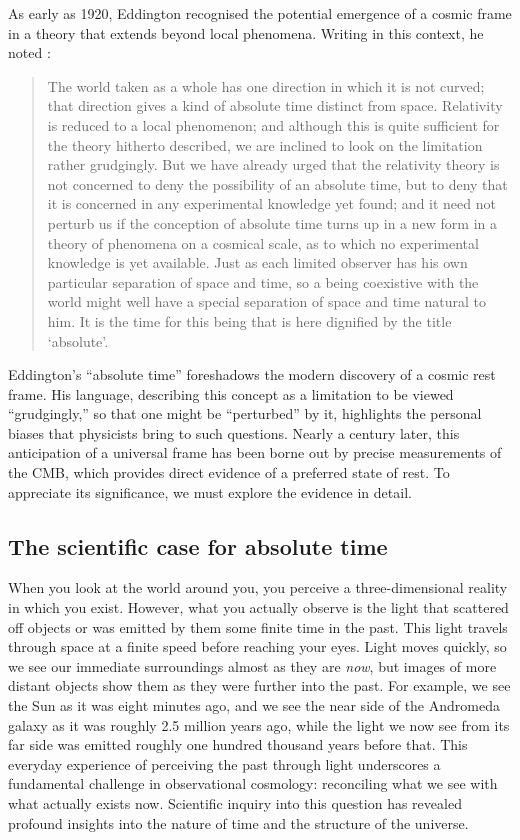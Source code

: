 \documentclass[aps,rmp,groupedaddress,twocolumn,10pt]{revtex4-2}
\begin{document}
As early as 1920, Eddington recognised the potential emergence of a cosmic frame in a theory that extends beyond local phenomena. Writing in this context, he noted \cite{Eddington1920}: 
\begin{quote}
The world taken as a whole has one direction in which it is not curved; that direction gives a kind of absolute time distinct from space. Relativity is reduced to a local phenomenon; and although this is quite sufficient for the theory hitherto described, we are inclined to look on the limitation rather grudgingly. But we have already urged that the relativity theory is not concerned to deny the possibility of an absolute time, but to deny that it is concerned in any experimental knowledge yet found; and it need not perturb us if the conception of absolute time turns up in a new form in a theory of phenomena on a cosmical scale, as to which no experimental knowledge is yet available. Just as each limited observer has his own particular separation of space and time, so a being coexistive with the world might well have a special separation of space and time natural to him. It is the time for this being that is here dignified by the title `absolute'.
\end{quote}

Eddington's ``absolute time'' foreshadows the modern discovery of a cosmic rest frame. His language, describing this concept as a limitation to be viewed ``grudgingly,'' so that one might be ``perturbed'' by it, highlights the personal biases that physicists bring to such questions. Nearly a century later, this anticipation of a universal frame has been borne out by precise measurements of the CMB, which provides direct evidence of a preferred state of rest. To appreciate its significance, we must explore the evidence in detail.

\subsection{The scientific case for absolute time}

When you look at the world around you, you perceive a three-dimensional reality in which you exist. However, what you actually observe is the light that scattered off objects or was emitted by them some finite time in the past. This light travels through space at a finite speed before reaching your eyes. Light moves quickly, so we see our immediate surroundings almost as they are \textit{now}, but images of more distant objects show them as they were further into the past. For example, we see the Sun as it was eight minutes ago, and we see the near side of the Andromeda galaxy as it was roughly 2.5 million years ago, while the light we now see from its far side was emitted roughly one hundred thousand years before that. This everyday experience of perceiving the past through light underscores a fundamental challenge in observational cosmology: reconciling what we see with what actually exists now. Scientific inquiry into this question has revealed profound insights into the nature of time and the structure of the universe.
\end{document}

